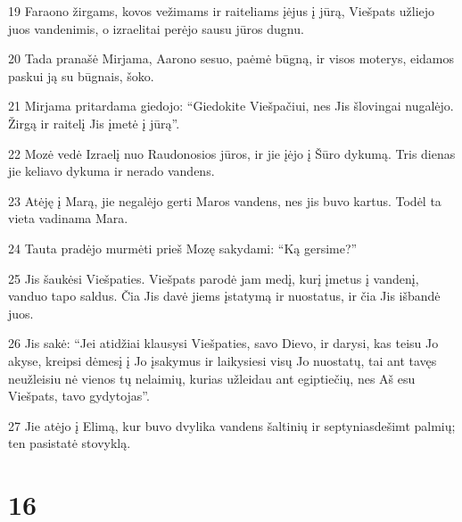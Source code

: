 \par 19 Faraono žirgams, kovos vežimams ir raiteliams įėjus į jūrą, Viešpats užliejo juos vandenimis, o izraelitai perėjo sausu jūros dugnu. 
\par 20 Tada pranašė Mirjama, Aarono sesuo, paėmė būgną, ir visos moterys, eidamos paskui ją su būgnais, šoko. 
\par 21 Mirjama pritardama giedojo: “Giedokite Viešpačiui, nes Jis šlovingai nugalėjo. Žirgą ir raitelį Jis įmetė į jūrą”. 
\par 22 Mozė vedė Izraelį nuo Raudonosios jūros, ir jie įėjo į Šūro dykumą. Tris dienas jie keliavo dykuma ir nerado vandens. 
\par 23 Atėję į Marą, jie negalėjo gerti Maros vandens, nes jis buvo kartus. Todėl ta vieta vadinama Mara. 
\par 24 Tauta pradėjo murmėti prieš Mozę sakydami: “Ką gersime?” 
\par 25 Jis šaukėsi Viešpaties. Viešpats parodė jam medį, kurį įmetus į vandenį, vanduo tapo saldus. Čia Jis davė jiems įstatymą ir nuostatus, ir čia Jis išbandė juos. 
\par 26 Jis sakė: “Jei atidžiai klausysi Viešpaties, savo Dievo, ir darysi, kas teisu Jo akyse, kreipsi dėmesį į Jo įsakymus ir laikysiesi visų Jo nuostatų, tai ant tavęs neužleisiu nė vienos tų nelaimių, kurias užleidau ant egiptiečių, nes Aš esu Viešpats, tavo gydytojas”. 
\par 27 Jie atėjo į Elimą, kur buvo dvylika vandens šaltinių ir septyniasdešimt palmių; ten pasistatė stovyklą.



\chapter{16}


